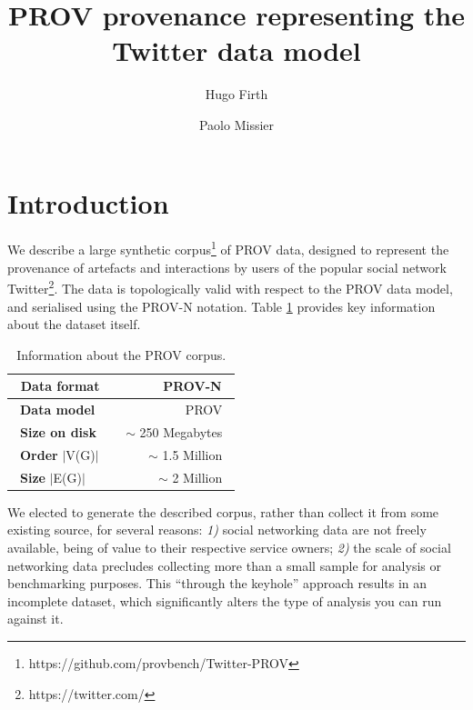 \documentclass{llncs2e/llncs}
\title{PROV provenance representing the Twitter data model}
\author{Hugo Firth \and Paolo Missier}
\institute{School of Computing Science, Newcastle University, UK\\
           \{h.firth, paolo.missier\}@ncl.ac.uk
}
\begin{document}
\maketitle

\section{Introduction}
%
We describe a large synthetic corpus\footnote{https://github.com/provbench/Twitter-PROV} of PROV data, designed to represent the provenance of artefacts and interactions by users of the popular social network Twitter\footnote{https://twitter.com/}.
%
The data is topologically valid with respect to the PROV data model\cite{PROV-DM}, and serialised using the PROV-N notation\cite{PROV-N}.
%
Table \ref{table:corpus-information} provides key information about the dataset itself.
%    
\begin{table}[H]
    \centering
    \label{table:corpus-information}
    \caption{Information about the PROV corpus.}
    \begin{tabular}{ | l | r | }
        \hline
        \, \textbf{Data format} \, &\, PROV-N \, \\ \hline
        \, \textbf{Data model} \, &\, PROV \, \\ \hline
        \, \textbf{Size on disk} \, &\, $\sim$ 250 Megabytes \, \\ \hline
        \, \textbf{Order} $\vert$V(G)$\vert$ \, &\, $\sim$ 1.5 Million \, \\ \hline
        \, \textbf{Size} $\vert$E(G)$\vert$ \, &\, $\sim$ 2 Million \, \\ \hline
    \end{tabular}
\end{table}
%
We elected to generate the described corpus, rather than collect it from some existing source, for several reasons:
%
\textit{1)} social networking data are not freely available, being of value to their respective service owners;
%
\textit{2)} the scale of social networking data precludes collecting more than a small sample for analysis or benchmarking purposes.
%
This ``through the keyhole'' approach results in an incomplete dataset, which significantly alters the type of analysis you can run against it.
% 
\end{document}
